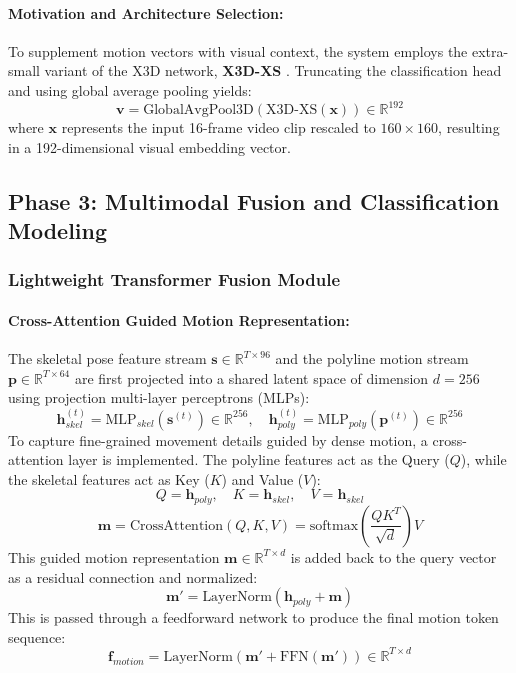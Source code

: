 \documentclass[12pt]{article}
\begin{document}
\paragraph{Motivation and Architecture Selection:}
To supplement motion vectors with visual context, the system employs the extra-small variant of the X3D network, \textbf{X3D-XS} \citep{feichtenhofer2020x3d}. Truncating the classification head and using global average pooling yields:
\[
\mathbf{v} = \text{GlobalAvgPool3D}(\text{X3D-XS}(\mathbf{x})) \in \mathbb{R}^{192}
\]
where $\mathbf{x}$ represents the input 16-frame video clip rescaled to $160 \times 160$, resulting in a 192-dimensional visual embedding vector.

\clearpage
\subsection{Phase 3: Multimodal Fusion and Classification Modeling}

\subsubsection{Lightweight Transformer Fusion Module}

\paragraph{Cross-Attention Guided Motion Representation:}
The skeletal pose feature stream $\mathbf{s} \in \mathbb{R}^{T \times 96}$ and the polyline motion stream $\mathbf{p} \in \mathbb{R}^{T \times 64}$ are first projected into a shared latent space of dimension $d = 256$ using projection multi-layer perceptrons (MLPs):
\[
\mathbf{h}_{skel}^{(t)} = \text{MLP}_{skel}(\mathbf{s}^{(t)}) \in \mathbb{R}^{256}, \quad \mathbf{h}_{poly}^{(t)} = \text{MLP}_{poly}(\mathbf{p}^{(t)}) \in \mathbb{R}^{256}
\]
To capture fine-grained movement details guided by dense motion, a cross-attention layer is implemented. The polyline features act as the Query ($Q$), while the skeletal features act as Key ($K$) and Value ($V$):
\[
Q = \mathbf{h}_{poly}, \quad K = \mathbf{h}_{skel}, \quad V = \mathbf{h}_{skel}
\]
\[
\mathbf{m} = \text{CrossAttention}(Q, K, V) = \text{softmax}\left(\frac{Q K^T}{\sqrt{d}}\right)V
\]
This guided motion representation $\mathbf{m} \in \mathbb{R}^{T \times d}$ is added back to the query vector as a residual connection and normalized:
\[
\mathbf{m}' = \text{LayerNorm}(\mathbf{h}_{poly} + \mathbf{m})
\]
This is passed through a feedforward network to produce the final motion token sequence:
\[
\mathbf{f}_{motion} = \text{LayerNorm}(\mathbf{m}' + \text{FFN}(\mathbf{m}')) \in \mathbb{R}^{T \times d}
\]
\end{document}
